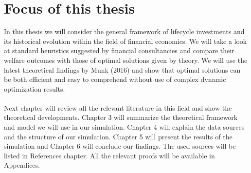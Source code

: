 \section{Focus of this thesis}
In this thesis we will consider the general framework of lifecycle investments and its historical evolution within the field of financial economics. We will take a look at standard heuristics suggested by financial consultancies and compare their welfare outcomes with those of optimal solutions given by theory. We will use the latest theoretical findings by Munk (2016) and show that optimal solutions can be both efficient and easy to comprehend without use of complex dynamic optimization results.
\paragraph*{}Next chapter will review all the relevant literature in this field and show the theoretical developments. Chapter 3 will summarize the theoretical framework and model we will use in our simulation. Chapter 4 will explain the data sources and the structure of our simulation. Chapter 5 will present the results of the simulation and Chapter 6 will conclude our findings. The used sources will be listed in References chapter. All the relevant proofs will be available in Appendices. 
